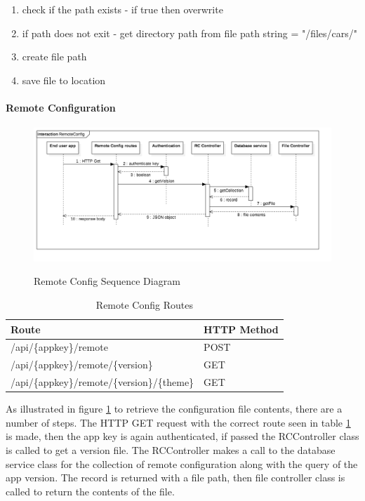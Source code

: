 \begin{enumerate}
  \item check if the path exists
  - if true then overwrite 
  \item if path does not exit
  - get directory path from file path string = "/files/cars/" 
  \item create file path
  \item save file to location
\end{enumerate}


\paragraph{Remote Configuration}

\begin{figure}[!h]
    \caption{Remote Config Sequence Diagram}
    \centering
    \includegraphics[width=150mm]{images/sequence/RemoteConfig}
    \label{fig:rc-seq}
\end{figure}

\begin{table}[!h]
\centering
\caption{Remote Config Routes}
\label{tb:rc-routes}
\begin{tabular}{|l|l|}
\hline
\rowcolor{green!20}
Route                                        & HTTP Method \\ \hline
/api/\{appkey\}/remote                       & POST        \\ \hline
/api/\{appkey\}/remote/\{version\}           & GET         \\ \hline
/api/\{appkey\}/remote/\{version\}/\{theme\} & GET         \\ \hline
\end{tabular}
\end{table}

As illustrated in figure \ref{fig:rc-seq} to retrieve the configuration file contents, there are a number of steps. The HTTP GET request with the correct route seen in table \ref{tb:rc-routes} is made, then the app key is again authenticated, if passed the RCController class is called to get a version file. The RCController makes a call to the database service class for the collection of remote configuration along with the query of the app version. The record is returned with a file path, then file controller class is called to return the contents of the file. 

